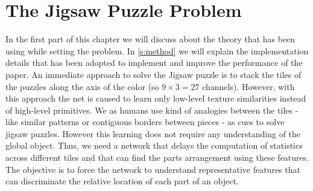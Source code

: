 \section{The Jigsaw Puzzle Problem}
In the first part of this chapter we will discuss about the theory that has been using while setting the problem. In \ref{s:method} we will explain the implementation details that has been adopted to implement and improve the performance of the paper.\newline
An immediate approach to solve the Jigsaw puzzle is to stack the tiles of the puzzles along the axis of the color (so \(9\times3=27\) channels). However, with this approach the net is caused to learn only low-level texture similarities instead of high-level primitives. We as humans use kind of analogies between the tiles - like similar patterns or contiguous borders between pieces - as cues to solve jigsaw puzzles. However this learning does not require any understanding of the global object. Thus, we need a network that delays the computation of statistics across different tiles and that can find the parts arrangement using these features. The objective is to force the network to understand representative features that can discriminate the relative location of each part of an object.


